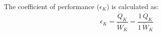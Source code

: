The coefficient of performance (\( \epsilon_K \)) is calculated as:  
\[
\epsilon_K = \frac{\dot{Q}_K}{\dot{W}_K} = \frac{1 \, \dot{Q}_K}{1 \, \dot{W}_K}
\]